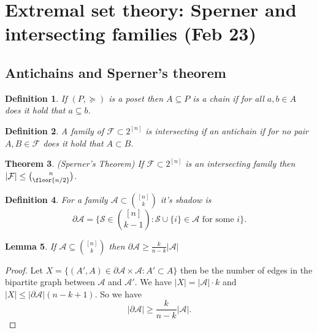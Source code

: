 \documentclass[a4paper]{article}
\newtheorem{thm}{Theorem}[section]
\newtheorem{lem}[thm]{Lemma}
\newtheorem{defn}[thm]{Definition}
\begin{document}
\section{Extremal set theory: Sperner and intersecting families (Feb 23)}

\subsection{Antichains and Sperner's theorem}

\begin{defn}
    If $(P,\succeq)$ is a poset then $A\subseteq P$ is a chain if for all $a,b\in A$ does it hold that $a\subseteq b$. 
\end{defn}
\begin{defn}
    A family of $\mathcal{F}\subset 2^{[n]}$ is intersecting if an antichain if for no pair $A,B\in \mathcal{F}$ does it hold that $A\subset B$. 
\end{defn}
\begin{thm}
    (Sperner's Theorem) If $\mathcal{F}\subset 2^{[n]}$ is an intersecting family then $|\mathcal{F}|\leq {n \choose \floor{n/2}}$.
\end{thm}
\begin{defn}
    For a family $\mathcal{A}\subset {[n] \choose k}$ it's shadow is \[
    \partial \mathcal{A}= \{\mathcal{S}\in {[n] \choose k-1}: \mathcal{S}\cup \{i\}\in \mathcal{A} \text{ for some $i$}\}
    .\] 
\end{defn}
\begin{lem}
    If $\mathcal{A}\subseteq {[n] \choose k}$ then $\partial \mathcal{A}\geq \frac{k}{n-k}|\mathcal{A}|$
\end{lem}
\begin{proof}
    Let $X= \{(A',A)\in \partial \mathcal{A}\times \mathcal{A}: A'\subset A\}$ then be the number of edges in the bipartite graph between $\mathcal{A}$ and $\mathcal{A}'$. We have $|X|=|\mathcal{A}|\cdot k$ and $|X|\leq |\partial \mathcal{A}|(n-k+1)$. So we have \[
    |\partial \mathcal{A}|\geq \frac{k}{n-k}|\mathcal{A}|
    .\] 
\end{proof}
\end{document}
